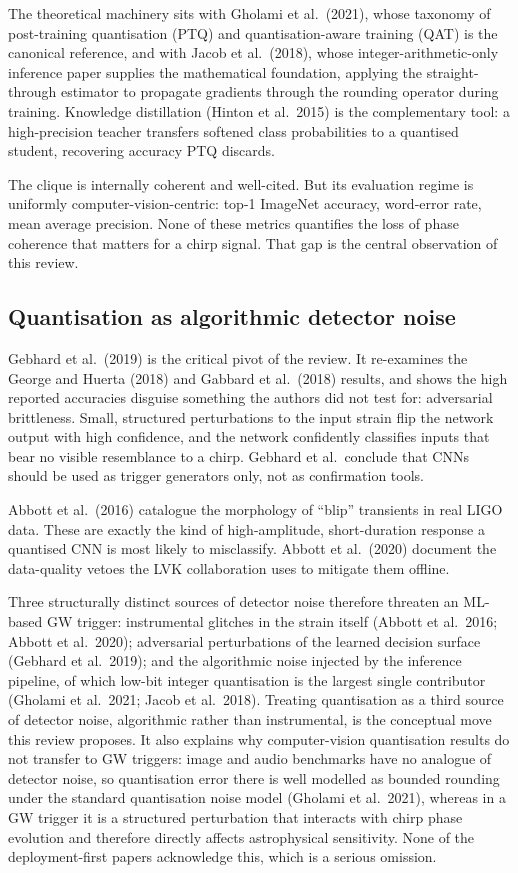 \documentclass[11pt,a4paper]{article}
\begin{document}
The theoretical machinery sits with Gholami et al.\ (2021), whose taxonomy of post-training quantisation (PTQ) and quantisation-aware training (QAT) is the canonical reference, and with Jacob et al.\ (2018), whose integer-arithmetic-only inference paper supplies the mathematical foundation, applying the straight-through estimator to propagate gradients through the rounding operator during training. Knowledge distillation (Hinton et al.\ 2015) is the complementary tool: a high-precision teacher transfers softened class probabilities to a quantised student, recovering accuracy PTQ discards.

The clique is internally coherent and well-cited. But its evaluation regime is uniformly computer-vision-centric: top-1 ImageNet accuracy, word-error rate, mean average precision. None of these metrics quantifies the loss of phase coherence that matters for a chirp signal. That gap is the central observation of this review.

\subsection{Quantisation as algorithmic detector noise}
Gebhard et al.\ (2019) is the critical pivot of the review. It re-examines the George and Huerta (2018) and Gabbard et al.\ (2018) results, and shows the high reported accuracies disguise something the authors did not test for: adversarial brittleness. Small, structured perturbations to the input strain flip the network output with high confidence, and the network confidently classifies inputs that bear no visible resemblance to a chirp. Gebhard et al.\ conclude that CNNs should be used as trigger generators only, not as confirmation tools.

Abbott et al.\ (2016) catalogue the morphology of ``blip'' transients in real LIGO data. These are exactly the kind of high-amplitude, short-duration response a quantised CNN is most likely to misclassify. Abbott et al.\ (2020) document the data-quality vetoes the LVK collaboration uses to mitigate them offline.

Three structurally distinct sources of detector noise therefore threaten an ML-based GW trigger: instrumental glitches in the strain itself (Abbott et al.\ 2016; Abbott et al.\ 2020); adversarial perturbations of the learned decision surface (Gebhard et al.\ 2019); and the algorithmic noise injected by the inference pipeline, of which low-bit integer quantisation is the largest single contributor (Gholami et al.\ 2021; Jacob et al.\ 2018). Treating quantisation as a third source of detector noise, algorithmic rather than instrumental, is the conceptual move this review proposes. It also explains why computer-vision quantisation results do not transfer to GW triggers: image and audio benchmarks have no analogue of detector noise, so quantisation error there is well modelled as bounded rounding under the standard quantisation noise model (Gholami et al.\ 2021), whereas in a GW trigger it is a structured perturbation that interacts with chirp phase evolution and therefore directly affects astrophysical sensitivity. None of the deployment-first papers acknowledge this, which is a serious omission.
\end{document}
